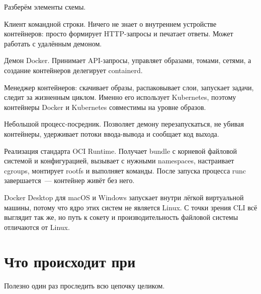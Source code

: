 Разберём элементы схемы.

\begin{description}[style=nextline]
  \item[docker CLI] Клиент командной строки. Ничего не знает о внутреннем
        устройстве контейнеров: просто формирует HTTP-запросы и печатает
        ответы. Может работать с удалённым демоном.
  \item[dockerd] Демон Docker. Принимает API-запросы, управляет образами,
        томами, сетями, а создание контейнеров делегирует containerd.
  \item[containerd] Менеджер контейнеров: скачивает образы, распаковывает
        слои, запускает задачи, следит за жизненным циклом. Именно его
        использует Kubernetes, поэтому контейнеры Docker и Kubernetes
        совместимы на уровне образов.
  \item[containerd-shim] Небольшой процесс-посредник. Позволяет демону
        перезапускаться, не убивая контейнеры, удерживает потоки
        ввода-вывода и сообщает код выхода.
  \item[runc] Реализация стандарта OCI Runtime. Получает bundle с корневой
        файловой системой и конфигурацией, вызывает 
        с нужными namespaces, настраивает cgroups, монтирует rootfs
        и выполняет  команды. После запуска процесса runc
        завершается~--- контейнер живёт без него.
\end{description}

\begin{notebox}
Docker Desktop для macOS и Windows запускает  внутри
лёгкой виртуальной машины, потому что ядро этих систем не является
Linux. С точки зрения CLI всё выглядит так же, но путь к сокету
и производительность файловой системы отличаются от Linux.
\end{notebox}

\section{Что происходит при }

Полезно один раз проследить всю цепочку целиком.

